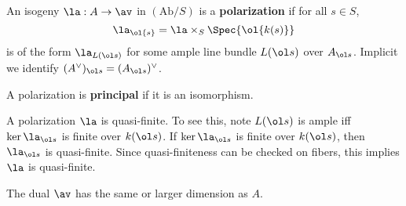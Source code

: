 \begin{df}
An isogeny $\la:A\to \av$ in $(\text{Ab}/S)$ is a \textbf{polarization} if for all $s\in S$, 
\[\la_{\ol{s}}=\la\times_S \Spec{\ol{k(s)}}\] %
 is of the form  $\la_{L(\ol s)}$ for some ample line bundle $L(\ol s)$ over $A_{\ol s}$. Implicit we identify $(A^{\vee})_{\ol s}=(A_{\ol s})^{\vee}$.

A polarization is \textbf{principal} if it is an isomorphism.
\end{df}
\begin{rem}
A polarization $\la$ is {quasi-finite}. To see this, note $L(\ol s)$ is ample iff $\ker \la_{\ol s}$ is finite over $k(\ol s)$. %
If $\ker\la_{\ol s}$ is finite over $k(\ol s)$, then  $\la_{\ol s}$ is  quasi-finite. Since quasi-finiteness can be checked on fibers, this implies $\la $ is quasi-finite. %

The dual $\av$ has the same or larger dimension as $A$.
\end{rem}
